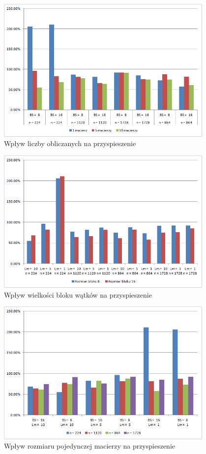 \documentclass[12pt,a4paper]{article}
\begin{document}
\begin{figure}[H]
  \centering
    \includegraphics[width=0.95\textwidth]{charts/Lm.png}
    \caption{Wpływ liczby obliczanych na przyspieszenie}
    \label{chart:Lm}
\end{figure}

\begin{figure}[H]
  \centering
    \includegraphics[width=0.95\textwidth]{charts/BS.png}
    \caption{Wpływ wielkości bloku wątków na przyspieszenie}
    \label{chart:BS}
\end{figure}

\begin{figure}[H]
  \centering
    \includegraphics[width=0.95\textwidth]{charts/MatrixSize.png}
    \caption{Wpływ rozmiaru pojedynczej macierzy na przyspieszenie}
    \label{chart:MatrixSize}
\end{figure}
\end{document}

